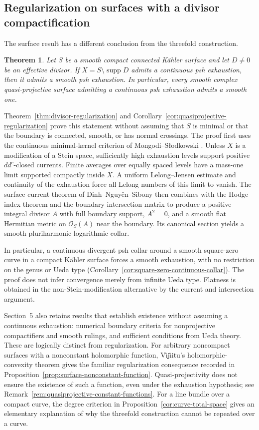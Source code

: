 \documentclass[11pt]{amsart}
\newtheorem{theorem}{Theorem}[section]
\theoremstyle{definition}
\theoremstyle{remark}
\numberwithin{equation}{section}
\newcommand{\supp}{\operatorname{supp}}
\begin{document}
\subsection{Regularization on surfaces with a divisor compactification}
The surface result has a different conclusion from the threefold
construction.

\begin{theorem}\label{thm:surface-introduction}
Let $S$ be a smooth compact connected K\"ahler surface and let
$D\ne0$ be an effective divisor.  If
$X=S\setminus\supp D$ admits a continuous psh exhaustion, then
it admits a smooth psh exhaustion.  In particular, every smooth
complex quasi-projective surface admitting a continuous psh
exhaustion admits a smooth one.
\end{theorem}

Theorem~\ref{thm:divisor-regularization} and
Corollary~\ref{cor:quasiprojective-regularization} prove this statement
without assuming that $S$ is minimal or that the boundary is connected,
smooth, or has normal crossings.  The proof first uses the continuous
minimal-kernel criterion of Mongodi--S{\l}odkowski
\cite[Lemma~2.1]{MongodiSlodkowski2020}.  Unless $X$ is a modification of a Stein
space, sufficiently high exhaustion levels support positive
$dd^c$-closed currents.  Finite averages over equally spaced levels
have a mass-one limit supported compactly inside $X$.  A uniform
Lelong--Jensen estimate and continuity of the exhaustion force all
Lelong numbers of this limit to vanish.  The surface current theorem
of Dinh--Nguy\^en--Sibony \cite[Corollary~2.4 and its proof]{DNS22}
then combines with the Hodge index theorem and the boundary
intersection matrix to produce a positive integral divisor $A$ with
full boundary support, $A^2=0$, and a smooth flat Hermitian metric on
$\mathcal O_S(A)$ near the boundary.  Its canonical section yields
a smooth pluriharmonic logarithmic collar.

In particular, a continuous divergent psh collar around a smooth
square-zero curve in a compact K\"ahler surface forces a smooth
exhaustion, with no restriction on the genus or Ueda type
(Corollary~\ref{cor:square-zero-continuous-collar}).  The proof
does not infer convergence merely from infinite Ueda type.  Flatness
is obtained in the non-Stein-modification alternative by the current
and intersection argument.

Section~5 also retains results that establish existence without
assuming a continuous exhaustion: numerical boundary criteria for
nonprojective compactifiers and smooth rulings, and sufficient
conditions from Ueda theory.  These are logically distinct from
regularization.  For arbitrary noncompact surfaces with a nonconstant
holomorphic function, V\^{\i}j\^{\i}itu's holomorphic-convexity theorem
\cite{Vajaitu2022} gives the familiar regularization consequence
recorded in Proposition~\ref{prop:surface-nonconstant-function}.
Quasi-projectivity does not ensure the existence of such a function,
even under the exhaustion hypothesis; see
Remark~\ref{rem:quasiprojective-constant-functions}.  For a
line bundle over a compact curve, the degree criterion in
Proposition~\ref{cor:curve-total-space} gives an elementary
explanation of why the threefold construction cannot be repeated
over a curve.
\end{document}

